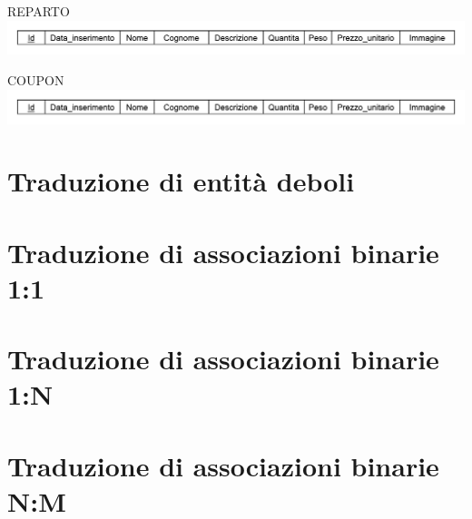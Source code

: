 REPARTO\\
\includegraphics[height=0.04\textheight]
{immagini/traduzione_prodotto}

COUPON\\
\includegraphics[height=0.04\textheight]{immagini/traduzione_prodotto}

\section{Traduzione di entità deboli}

\section{Traduzione di associazioni binarie 1:1}

\section{Traduzione di associazioni binarie 1:N}

\section{Traduzione di associazioni binarie N:M}